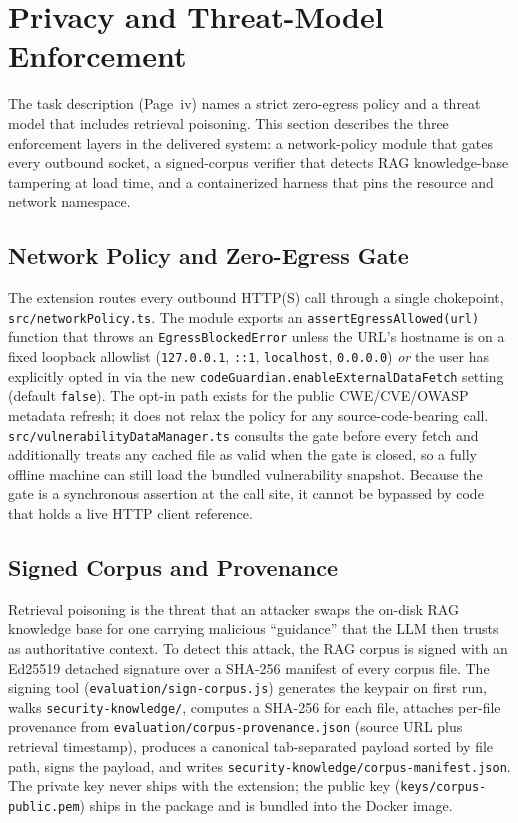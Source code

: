 \section{Privacy and Threat-Model Enforcement}
\label{sec:impl-privacy-enforcement}

The task description (Page~iv) names a strict zero-egress policy and a
threat model that includes retrieval poisoning. This section describes the
three enforcement layers in the delivered system: a network-policy module
that gates every outbound socket, a signed-corpus verifier that detects
RAG knowledge-base tampering at load time, and a containerized harness
that pins the resource and network namespace.

\subsection{Network Policy and Zero-Egress Gate}
\label{sec:impl-network-policy}

The extension routes every outbound HTTP(S) call through a single
chokepoint, \texttt{src/networkPolicy.ts}. The module exports an
\texttt{assertEgressAllowed(url)} function that throws an
\texttt{EgressBlockedError} unless the URL's hostname is on a fixed
loopback allowlist (\texttt{127.0.0.1}, \texttt{::1}, \texttt{localhost},
\texttt{0.0.0.0}) \emph{or} the user has explicitly opted in via the new
\texttt{codeGuardian.enableExternalDataFetch} setting (default
\texttt{false}). The opt-in path exists for the public CWE/CVE/OWASP
metadata refresh; it does not relax the policy for any source-code-bearing
call. \texttt{src/vulnerabilityDataManager.ts} consults the gate before
every fetch and additionally treats any cached file as valid when the gate
is closed, so a fully offline machine can still load the bundled
vulnerability snapshot. Because the gate is a synchronous assertion at
the call site, it cannot be bypassed by code that holds a live HTTP
client reference.

\subsection{Signed Corpus and Provenance}
\label{sec:impl-corpus-signing}

Retrieval poisoning is the threat that an attacker swaps the on-disk RAG
knowledge base for one carrying malicious ``guidance'' that the LLM then
trusts as authoritative context. To detect this attack, the RAG corpus is
signed with an Ed25519 detached signature over a SHA-256 manifest of every
corpus file. The signing tool
(\texttt{evaluation/sign-corpus.js}) generates the keypair on first run,
walks \texttt{security-knowledge/}, computes a SHA-256 for each file,
attaches per-file provenance from
\texttt{evaluation/corpus-provenance.json} (source URL plus retrieval
timestamp), produces a canonical tab-separated payload sorted by file
path, signs the payload, and writes
\texttt{security-knowledge/corpus-manifest.json}. The private key never
ships with the extension; the public key
(\texttt{keys/corpus-public.pem}) ships in the package and is bundled
into the Docker image.

